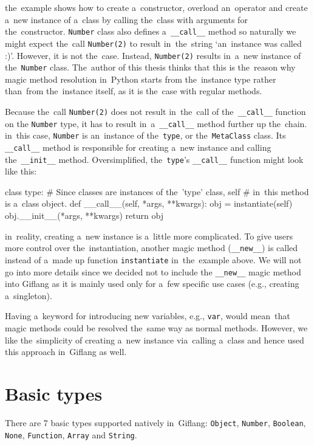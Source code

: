 the~example shows how to create a~constructor, overload an~operator and create a~new instance of a~class by calling the~class with arguments for the~constructor.
\texttt{Number} class also defines a~\texttt{\_\_call\_\_} method so naturally we might expect the~call \texttt{Number(2)} to result in~the~string
`an~instance was called :)'. However, it is not the~case. Instead, \texttt{Number(2)} results in~a~new instance of the~\texttt{Number} class. The~author of this
thesis thinks that this is the~reason why magic method resolution in~Python starts from the~instance type rather than~from the~instance itself, as it is
the~case with regular methods.

Because the~call \texttt{Number(2)} does not result in~the~call of the~\texttt{\_\_call\_\_} function on the
\texttt{Number} type, it has to result in~a~\texttt{\_\_call\_\_} method further up the~chain. in~this case, \texttt{Number} is an~instance of the~\texttt{type},
or the~\texttt{MetaClass} class. Its \texttt{\_\_call\_\_} method is responsible for creating a~new instance and calling the~\texttt{\_\_init\_\_} method. Oversimplified,
the~\texttt{type}'s \texttt{\_\_call\_\_} function might look like this:
\begin{code}
class type:
    # Since classes are instances of the~'type' class, self
    # in~this method is a~class object. 
    def __call__(self, *args, **kwargs):
        obj = instantiate(self)
        obj.__init__(*args, **kwargs)
        return obj
\end{code}

in~reality, creating a~new instance is a~little more complicated. To give users more control over the~instantiation, another magic method (\texttt{\_\_new\_\_})
is called instead of a~made up function \texttt{instantiate} in~the~example above. We will not go into more details since we decided not to include the
\texttt{\_\_new\_\_} magic method into Giflang as it is mainly used only for a~few specific use cases (e.g., creating a~singleton).

Having a~keyword for introducing new variables, e.g., \texttt{var}, would mean~that magic methods could be resolved the~same way as normal methods. However,
we like the~simplicity of creating a~new instance via~calling a~class and hence used this approach in~Giflang as well.

\section{Basic types}
There are 7 basic types supported natively in~Giflang: \texttt{Object}, \texttt{Number}, \texttt{Boolean}, \texttt{None}, \texttt{Function},
\texttt{Array} and \texttt{String}.

